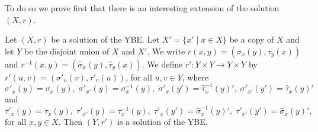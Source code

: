 To do so we prove first that there is an interesting extension of the solution $(X,r)$.

\begin{proposition}
\label{prop:extendsol}
Let $(X,r)$ be a solution of the YBE. Let $X'=\{x'\mid x\in X\}$ be a copy of $X$ and let $Y$ be the disjoint union of $X$ and $X'$. We write $r(x,y)=(\sigma_x(y),\tau_y(x))$ and $r^{-1}(x,y)=(\widehat{\sigma}_x(y),\widehat{\tau}_y(x))$. We define $r'\colon Y\times Y\rightarrow Y\times Y$ by $r'(u,v)=(\sigma'_u(v),\tau'_v(u))$, for all $u,v\in Y$, where
\[ \sigma'_x(y)=\sigma_x(y),\; \sigma'_{x'}(y)=\sigma^{-1}_x(y),\; \sigma'_{x}(y')=\widehat{\tau}^{-1}_x(y)',\; \sigma'_{x'}(y')=\widehat{\tau}_x(y)'\]
and
\[ \tau'_x(y)=\tau_x(y),\; \tau'_{x'}(y)=\tau^{-1}_x(y),\; \tau'_{x}(y')=\widehat{\sigma}^{-1}_x(y)',\; \tau'_{x'}(y')=\widehat{\sigma}_x(y)',\]
for all $x,y\in X$. Then $(Y,r')$ is a solution of the YBE.
\end{proposition}


